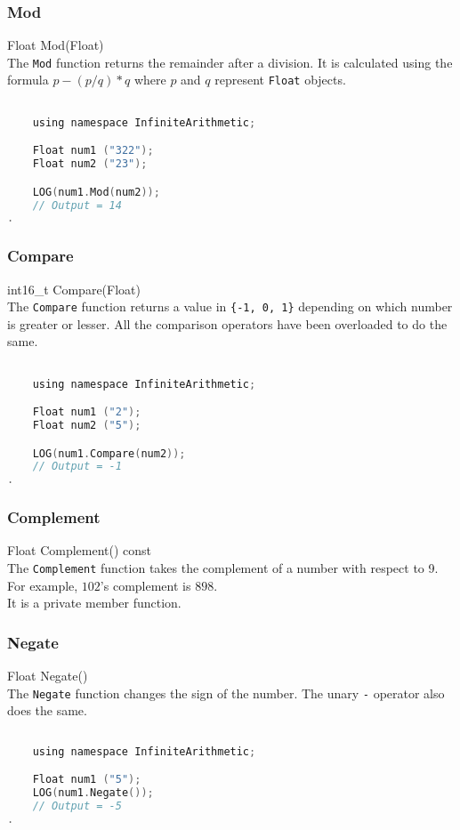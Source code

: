 \subsubsection{Mod}
{\ttfamily \large Float Mod(Float)} \\[2mm]
The \verb|Mod| function returns the remainder after a division. It is calculated using the formula $p - (p/q)*q$ where $p$ and $q$ represent \verb|Float| objects.
\vspace*{1em}
\begin{lstlisting}[language = C]

	using namespace InfiniteArithmetic;

	Float num1 ("322");
	Float num2 ("23");

	LOG(num1.Mod(num2));
	// Output = 14
.
\end{lstlisting}
\vspace*{1em}


\subsubsection{Compare}
{\ttfamily \large int16\_t Compare(Float)} \\[2mm]
The \verb|Compare| function returns a value in \verb|{-1, 0, 1}| depending on which number is greater or lesser. All the comparison operators have been overloaded to do the same.
\vspace*{1em}
\begin{lstlisting}[language = C]

	using namespace InfiniteArithmetic;

	Float num1 ("2");
	Float num2 ("5");

	LOG(num1.Compare(num2));
	// Output = -1
.
\end{lstlisting}
\vspace*{1em}


\subsubsection{Complement}
{\ttfamily \large Float Complement() const} \\[2mm]
The \verb|Complement| function takes the complement of a number with respect to 9. For example, $102$'s complement is $898$. \\
It is a private member function.


\subsubsection{Negate}
{\ttfamily \large Float Negate()} \\[2mm]
The \verb|Negate| function changes the sign of the number. The unary \verb|-| operator also does the same.
\vspace*{1em}
\begin{lstlisting}[language = C]
	
	using namespace InfiniteArithmetic;

	Float num1 ("5");
	LOG(num1.Negate());
	// Output = -5
.
\end{lstlisting}
\vspace*{1em}


